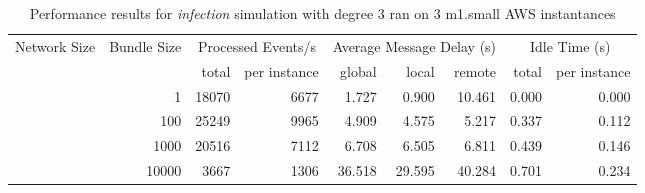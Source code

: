 \begin{table}
	  \caption[Performance results, \emph{infection:3 on 3 m1.small instances }]{ Performance results for \emph{ infection } simulation with degree 3 ran on 3 m1.small AWS instantances }
	\begin{tabular}{rrrrrrrrr}
	\hline\noalign{\smallskip}

	Network Size &
	Bundle Size &
	\multicolumn{2}{c}{Processed Events/s} & 
	\multicolumn{3}{c}{Average Message Delay (s)} & 
	\multicolumn{2}{c}{Idle Time (s)}  \\

	 & 
	 & 
	 total & per instance
     & global & local & remote
     & total & per instance\\

			
				\noalign{\smallskip}\hline
				\multirow{ 4 }{*}{ 40000 } &
				
					
					 
					\multirow{ 1 }{*}{ 1 } &
					
						
							    
							     18070  & 6677  
	                           & 1.727 & 0.900 & 10.461
	                           & 0.000 & 0.000  \\
	                
	            
					 &  
					 
					\multirow{ 1 }{*}{ 100 } &
					
						
							    
							     25249  & 9965  
	                           & 4.909 & 4.575 & 5.217
	                           & 0.337 & 0.112  \\
	                
	            
					 &  
					 
					\multirow{ 1 }{*}{ 1000 } &
					
						
							    
							     20516  & 7112  
	                           & 6.708 & 6.505 & 6.811
	                           & 0.439 & 0.146  \\
	                
	            
					 &  
					 
					\multirow{ 1 }{*}{ 10000 } &
					
						
							    
							     3667  & 1306  
	                           & 36.518 & 29.595 & 40.284
	                           & 0.701 & 0.234  \\
	                

\end{tabular}
\end{table}
